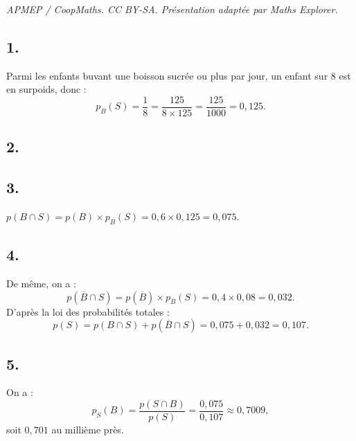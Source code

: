 \documentclass[10pt]{article}
\begin{document}
\noindent\textit{APMEP / CoopMaths. CC BY-SA. Présentation adaptée par Maths Explorer.}\par\medskip
\subsection*{1.}

Parmi les enfants buvant une boisson sucrée ou plus par jour, un enfant sur 8 est en surpoids, donc :
\[
p_B(S) = \frac{1}{8} = \frac{125}{8 \times 125} = \frac{125}{1000} = 0{,}125.
\]

\subsection*{2.}

\begin{center}
\end{center}

\subsection*{3.}

\(p(B \cap S) = p(B) \times p_B(S) = 0{,}6 \times 0{,}125 = 0{,}075\).

\subsection*{4.}

De même, on a :
\[
p(\overline{B} \cap S) = p(\overline{B}) \times p_{\overline{B}}(S) = 0{,}4 \times 0{,}08 = 0{,}032.
\]
D'après la loi des probabilités totales :
\[
p(S) = p(B \cap S) + p(\overline{B} \cap S) = 0{,}075 + 0{,}032 = 0{,}107.
\]

\subsection*{5.}

On a :
\[
p_S(B) = \frac{p(S \cap B)}{p(S)} = \frac{0{,}075}{0{,}107} \approx 0{,}7009,
\]
soit  \( 0{,}701 \) au millième près.
\end{document}
